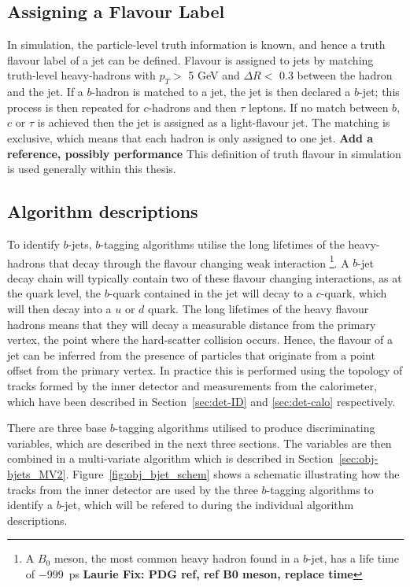    \subsection{Assigning a Flavour Label}
   \label{sec:obj-bjets_label}

   In simulation, the particle-level truth information is known, and hence a truth flavour label of a jet can be defined.
   Flavour is assigned to jets by matching truth-level heavy-hadrons with $p_{T} >$ 5 GeV and $\Delta R <$ 0.3 between the hadron and the jet.
   If a $b$-hadron is matched to a jet, the jet is then declared a $b$-jet;
   this process is then repeated for $c$-hadrons and then $\tau$ leptons.
   If no match between $b$, $c$ or $\tau$ is achieved then the jet is assigned as a light-flavour jet.
   The matching is exclusive, which means that each hadron is only assigned to one jet. \textbf{Add a reference, possibly performance}
   This definition of truth flavour in simulation is used generally within this thesis.
   
   \subsection{Algorithm descriptions}

   To identify $b$-jets, $b$-tagging algorithms utilise the long lifetimes of the heavy-hadrons that decay through the flavour changing weak interaction
   \footnote{A $B_{0}$ meson, the most common heavy hadron found in a $b$-jet, has a life time of \SI{-999}{\pico\second} \textbf{Laurie Fix: PDG ref, ref B0 meson, replace time}}.
   A $b$-jet decay chain  will typically contain two of these flavour changing interactions, 
   as at the quark level, the $b$-quark contained in the jet will decay to a $c$-quark, which will then decay into a $u$ or $d$ quark.
   The long lifetimes of the heavy flavour hadrons means that they will decay a measurable distance from the 
   primary vertex, the point where the hard-scatter collision occurs.
   Hence, the flavour of a jet can be inferred from the presence of particles
   that originate from a point offset from the primary vertex.
   In practice this is performed using the topology of tracks formed by the inner detector
   and measurements from the calorimeter, which have been described in Section~\ref{sec:det-ID} and \ref{sec:det-calo} respectively.
   
   There are three base $b$-tagging algorithms utilised to produce discriminating variables, which are described in the next three sections.
   The variables are then combined in a multi-variate algorithm which is described in Section~\ref{sec:obj-bjets_MV2}.
   Figure~\ref{fig:obj_bjet_schem} shows a schematic illustrating how the tracks from the inner detector
   are used by the three $b$-tagging algorithms to identify a $b$-jet, which will be refered to during the individual algorithm descriptions.
   
